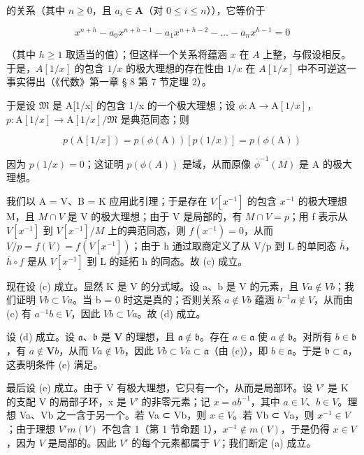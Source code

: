 的关系（其中 \(n \geqslant 0\)，且 \(a_{i} \in \mathbf{A}\)（对 \(0 \leqslant i \leqslant n\)）），它等价于

\[
x ^ {n + h} - a _ {0} x ^ {n + h - 1} - a _ {1} x ^ {n + h - 2} - \dots - a _ {n} x ^ {h - 1} = 0
\]

（其中 \(h \geqslant 1\) 取适当的值）；但这样一个关系将蕴涵 \(x\) 在 \(A\) 上整，与假设相反。于是，\(A[1/x]\) 的包含 \(1/x\) 的极大理想的存在性由 \(1/x\) 在 \(A[1/x]\) 中不可逆这一事实得出（《代数》第一章 § 8 第 7 节定理 2）。

于是设 \(\mathfrak{M}\) 是 A{[}1/x{]} 的包含 1/x 的一个极大理想；设 \(\phi: \mathrm{A} \to \mathrm{A}[1/x]\)，\(p: \mathrm{A}[1/x] \to \mathrm{A}[1/x]/\mathfrak{M}\) 是典范同态；则

\[
p (\mathrm{A} [ 1 / x ]) = p (\phi (\mathrm{A})) [ p (1 / x) ] = p (\phi (\mathrm{A}))
\]

因为 \(p(1/x) = 0\)；这证明 \(p(\phi(A))\) 是域，从而原像 \(\overline{\phi}^{-1}(M)\) 是 A 的极大理想。

我们以 A = V、B = K 应用此引理；于是存在 \(V[x^{-1}]\) 的包含 \(x^{-1}\) 的极大理想 M，且 \(M \cap V\) 是 V 的极大理想；由于 V 是局部的，有 \(M \cap V = p\)；用 f 表示从 \(V[x^{-1}]\) 到 \(V[x^{-1}] / M\) 上的典范同态，则 \(f(x^{-1}) = 0\)，从而 \(V / p = f(V) = f(V[x^{-1}])\)；由于 h 通过取商定义了从 V/p 到 L 的单同态 \(\bar{h}\)，\(\bar{h} \circ f\) 是从 \(V[x^{-1}]\) 到 L 的延拓 h 的同态。故 (c) 成立。

现在设 (c) 成立。显然 K 是 V 的分式域。设 a、b 是 V 的元素，且 \(Va \notin Vb\)；我们证明 \(Vb \subset Va\)。当 b = 0 时这是真的；否则关系 \(a \notin Vb\) 蕴涵 \(b^{-1}a \notin V\)，从而由 (c) 有 \(a^{-1}b \in V\)，因此 \(Vb \subset Va\)。故 (d) 成立。

设 (d) 成立。设 \(\mathfrak{a}\)、\(\mathfrak{b}\) 是 \(\mathbf{V}\) 的理想，且 \(\mathfrak{a} \notin \mathfrak{b}\)。存在 \(a \in \mathfrak{a}\) 使 \(a \notin \mathfrak{b}\)。对所有 \(b \in \mathfrak{b}\)，有 \(a \notin \mathbf{V}b\)，从而 \(Va \notin Vb\)，因此 \(Vb \subset Va \subset \mathfrak{a}\)（由 (c)），即 \(b \in \mathfrak{a}\)。于是 \(\mathfrak{b} \subset \mathfrak{a}\)，这表明条件 (e) 满足。

最后设 (e) 成立。由于 V 有极大理想，它只有一个，从而是局部环。设 \(V'\) 是 K 的支配 V 的局部子环，x 是 \(V'\) 的非零元素；记 \(x = ab^{-1}\)，其中 \(a \in V\)、\(b \in V\)。理想 Va、Vb 之一含于另一个。若 Va ⊂ Vb，则 \(x \in V\)。若 Vb ⊂ Va，则 \(x^{-1} \in V\)；由于理想 \(V'm(V)\) 不包含 1（第 1 节命题 1），\(x^{-1} \notin m(V)\)，于是仍得 \(x \in V\)，因为 \(V\) 是局部的。因此 \(V'\) 的每个元素都属于 \(V\)；我们断定 (a) 成立。

